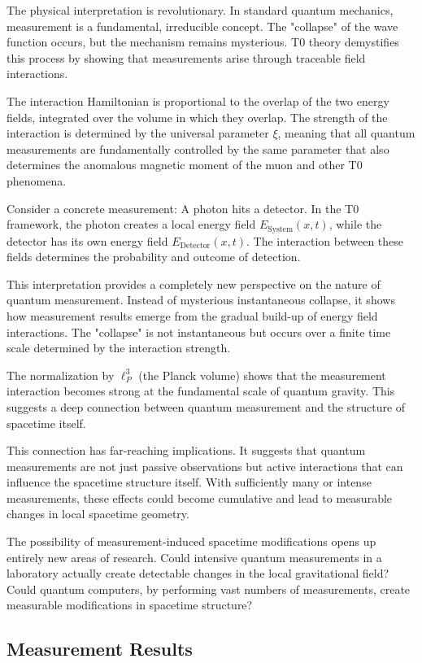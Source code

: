 \documentclass[12pt,a4paper]{article}
\newcommand{\xipar}{\xi}
\theoremstyle{definition}
\theoremstyle{remark}
\begin{document}
The physical interpretation is revolutionary. In standard quantum mechanics, measurement is a fundamental, irreducible concept. The "collapse" of the wave function occurs, but the mechanism remains mysterious. T0 theory demystifies this process by showing that measurements arise through traceable field interactions.

The interaction Hamiltonian is proportional to the overlap of the two energy fields, integrated over the volume in which they overlap. The strength of the interaction is determined by the universal parameter $\xipar$, meaning that all quantum measurements are fundamentally controlled by the same parameter that also determines the anomalous magnetic moment of the muon and other T0 phenomena.

Consider a concrete measurement: A photon hits a detector. In the T0 framework, the photon creates a local energy field $E_{\text{System}}(x,t)$, while the detector has its own energy field $E_{\text{Detector}}(x,t)$. The interaction between these fields determines the probability and outcome of detection.

This interpretation provides a completely new perspective on the nature of quantum measurement. Instead of mysterious instantaneous collapse, it shows how measurement results emerge from the gradual build-up of energy field interactions. The "collapse" is not instantaneous but occurs over a finite time scale determined by the interaction strength.

The normalization by $\ell_P^3$ (the Planck volume) shows that the measurement interaction becomes strong at the fundamental scale of quantum gravity. This suggests a deep connection between quantum measurement and the structure of spacetime itself.

This connection has far-reaching implications. It suggests that quantum measurements are not just passive observations but active interactions that can influence the spacetime structure itself. With sufficiently many or intense measurements, these effects could become cumulative and lead to measurable changes in local spacetime geometry.

The possibility of measurement-induced spacetime modifications opens up entirely new areas of research. Could intensive quantum measurements in a laboratory actually create detectable changes in the local gravitational field? Could quantum computers, by performing vast numbers of measurements, create measurable modifications in spacetime structure?

\subsection{Measurement Results}
\end{document}
